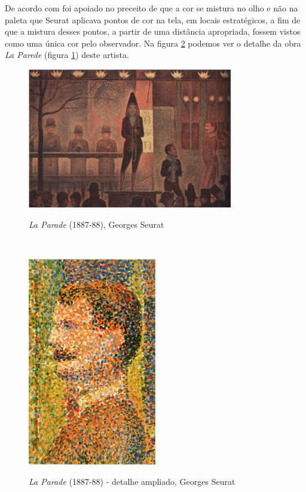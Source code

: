 De acordo com  foi apoiado no preceito de que a cor se mistura no olho e não na paleta que Seurat aplicava pontos de cor na tela, em locais estratégicos, a fim de que a mistura desses pontos, a partir de uma distância apropriada, fossem vistos como uma única cor pelo observador. Na figura \ref{fig:seurat_la_parede_detalhe} podemos ver o detalhe da obra \textit{La Parede} (figura \ref{fig:seurat_la_parede}) deste artista.

\begin{figure}[H]
    \centering
    \caption{\textit{La Parade} (1887-88), Georges Seurat}
	\vspace*{0,2cm}
    \includegraphics[width=0.8\textwidth]{./04-figuras/seurat_la_parede}
    \label{fig:seurat_la_parede}
\end{figure}
\vspace*{-0,9cm}
{\raggedright {}}\\
   
\begin{figure}[H]
    \centering
    \caption{\textit{La Parade} (1887-88) - detalhe ampliado, Georges Seurat}
	\vspace*{0,2cm}
    \includegraphics[width=0.5\textwidth]{./04-figuras/seurat_la_parede_detalhe}
    \label{fig:seurat_la_parede_detalhe}
\end{figure}
\vspace*{-0,9cm}
{\raggedright {}}\\

